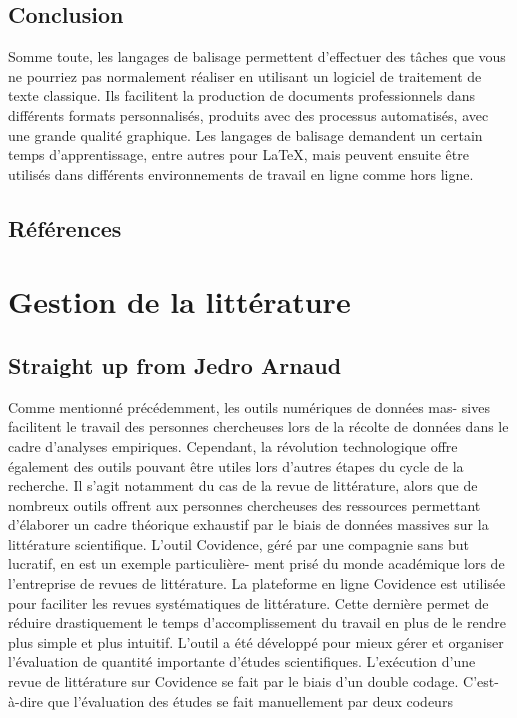 \documentclass[
  letterpaper,
]{scrbook}
\begin{document}
\hypertarget{conclusion-1}{%
\section{Conclusion}\label{conclusion-1}}

Somme toute, les langages de balisage permettent d'effectuer des tâches
que vous ne pourriez pas normalement réaliser en utilisant un logiciel
de traitement de texte classique. Ils facilitent la production de
documents professionnels dans différents formats personnalisés, produits
avec des processus automatisés, avec une grande qualité graphique. Les
langages de balisage demandent un certain temps d'apprentissage, entre
autres pour \LaTeX, mais peuvent ensuite être utilisés dans différents
environnements de travail en ligne comme hors ligne.

\hypertarget{ruxe9fuxe9rences}{%
\section{Références}\label{ruxe9fuxe9rences}}


\hypertarget{gestion-de-la-littuxe9rature}{%
\chapter{Gestion de la littérature}\label{gestion-de-la-littuxe9rature}}

\hypertarget{straight-up-from-jedro-arnaud}{%
\section{Straight up from Jedro
Arnaud}\label{straight-up-from-jedro-arnaud}}

Comme mentionné précédemment, les outils numériques de données mas-
sives facilitent le travail des personnes chercheuses lors de la récolte
de données dans le cadre d'analyses empiriques. Cependant, la révolution
technologique offre également des outils pouvant être utiles lors
d'autres étapes du cycle de la recherche. Il s'agit notamment du cas de
la revue de littérature, alors que de nombreux outils offrent aux
personnes chercheuses des ressources permettant d'élaborer un cadre
théorique exhaustif par le biais de données massives sur la littérature
scientifique. L'outil Covidence, géré par une compagnie sans but
lucratif, en est un exemple particulière- ment prisé du monde académique
lors de l'entreprise de revues de littérature. La plateforme en ligne
Covidence est utilisée pour faciliter les revues systématiques de
littérature. Cette dernière permet de réduire drastiquement le temps
d'accomplissement du travail en plus de le rendre plus simple et plus
intuitif. L'outil a été développé pour mieux gérer et organiser
l'évaluation de quantité importante d'études scientifiques. L'exécution
d'une revue de littérature sur Covidence se fait par le biais d'un
double codage. C'est- à-dire que l'évaluation des études se fait
manuellement par deux codeurs
\end{document}
